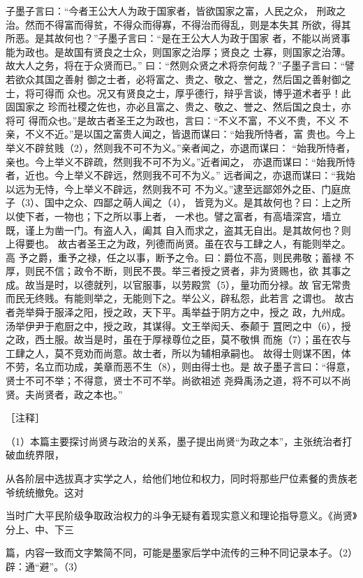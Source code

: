 \documentclass[12pt,UTF8]{ctexbook}
\begin{document}
子墨子言曰：“今者王公大人为政于国家者，皆欲国家之富，人民之众， 
刑政之治。然而不得富而得贫，不得众而得寡，不得治而得乱，则是本失其 
所欲，得其所恶。是其故何也？”子墨子言曰：“是在王公大人为政于国家 
者，不能以尚贤事能为政也。是故国有贤良之士众，则国家之治厚；贤良之 
士寡，则国家之治薄。故大人之务，将在于众贤而已。” 
曰：“然则众贤之术将奈何哉？”子墨子言曰：“譬若欲众其国之善射 
御之士者，必将富之、贵之、敬之、誉之，然后国之善射御之士，将可得而 
众也。况又有贤良之士，厚乎德行，辩乎言谈，博乎道术者乎！此固国家之 
珍而社稷之佐也，亦必且富之、贵之、敬之、誉之、然后国之良士，亦将可 
得而众也。”是故古者圣王之为政也，言曰：“不义不富，不义不贵，不义 
不亲，不义不近。”是以国之富贵人闻之，皆退而谋曰：“始我所恃者，富 
贵也。今上举义不辟贫贱（2），然则我不可不为义。”亲者闻之，亦退而谋曰： 
“始我所恃者，亲也。今上举义不辟疏，然则我不可不为义。”近者闻之， 
亦退而谋曰：“始我所恃者，近也。今上举义不辟远，然则我不可不为义。” 
远者闻之，亦退而谋曰：“我始以远为无恃，今上举义不辟远，然则我不可 
不为义。”逮至远鄙郊外之臣、门庭庶子（3）、国中之众、四鄙之萌人闻之（4）， 
皆竞为义。是其故何也？曰：上之所以使下者，一物也；下之所以事上者， 
一术也。譬之富者，有高墙深宫，墙立既，谨上为凿一门。有盗人入，阖其 
自入而求之，盗其无自出。是其故何也？则上得要也。 
故古者圣王之为政，列德而尚贤。虽在农与工肆之人，有能则举之。高 
予之爵，重予之禄，任之以事，断予之令。曰：爵位不高，则民弗敬；蓄禄 
不厚，则民不信；政令不断，则民不畏。举三者授之贤者，非为贤赐也，欲 
其事之成。故当是时，以德就列，以官服事，以劳殿赏（5），量功而分禄。故 
官无常贵而民无终贱。有能则举之，无能则下之。举公义，辟私怨，此若言 
之谓也。 
故古者尧举舜于服泽之阳，授之政，天下平。禹举益于阴方之中，授之 
政，九州成。汤举伊尹于庖厨之中，授之政，其谋得。文王举闳夭、泰颠于 
罝罔之中（6），授之政，西土服。故当是时，虽在于厚禄尊位之臣，莫不敬惧 
而施（7）；虽在农与工肆之人，莫不竞劝而尚意。故士者，所以为辅相承嗣也。 
故得士则谋不困，体不劳，名立而功成，美章而恶不生（8），则由得士也。是 
故子墨子言曰：“得意，贤士不可不举；不得意，贤士不可不举。尚欲祖述 
尧舜禹汤之道，将不可以不尚贤。夫尚贤者，政之本也。” 


［注释］ 

（1）本篇主要探讨尚贤与政治的关系，墨子提出尚贤“为政之本”，主张统治者打破血统界限， 

从各阶层中选拔真才实学之人，给他们地位和权力，同时将那些尸位素餐的贵族老爷统统撤免。这对 

当时广大平民阶级争取政治权力的斗争无疑有着现实意义和理论指导意义。《尚贤》分上、中、下三 

篇，内容一致而文字繁简不同，可能是墨家后学中流传的三种不同记录本子。（2）辟：通“避”。（3） 
\end{document}
